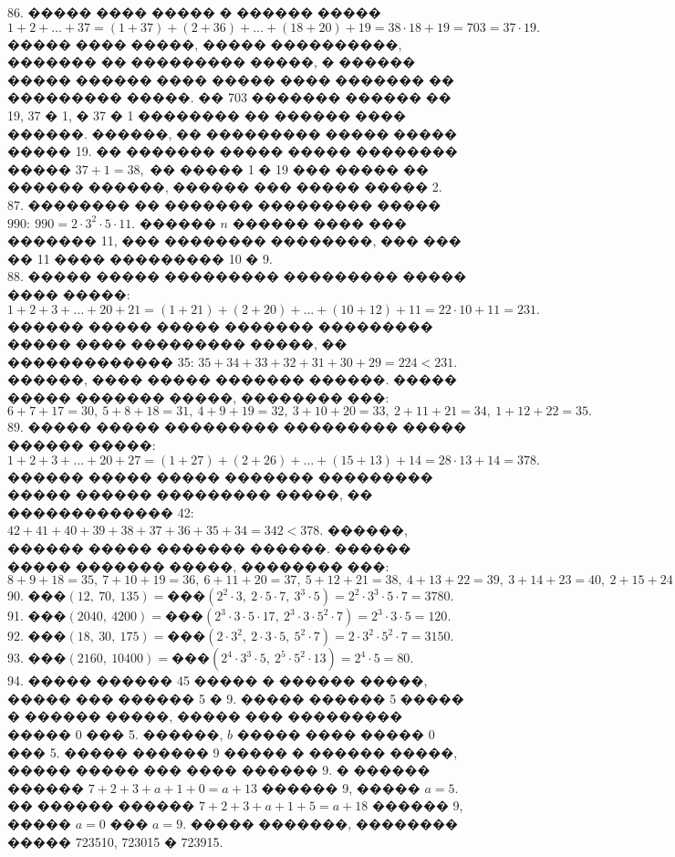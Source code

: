 \documentclass[12pt]{article}
\begin{document}
86. ����� ���� ����� � ������ ����� $1+2+\ldots+37=(1+37)+(2+36)+\ldots+(18+20)+19=38\cdot18+19=703=37\cdot19.$ ����� ���� �����, ����� ����������, ������� �� ��������� �����, � ������ ����� ������ ���� ����� ���� ������� �� ��������� �����. �� 703 ������� ������ �� 19, 37 � 1, � 37 � 1 �������� �� ������ ���� ������. ������, �� ��������� ����� ����� ����� 19. �� ������� ����� ����� �������� ����� $37+1=38,$ �� ����� 1 � 19 ��� ����� �� ������ ������, ������ ��� ����� ����� 2.\\
87. �������� �� ������� ��������� ����� $990:\ 990=2\cdot3^2\cdot5\cdot11.$ ������ $n$ ������ ���� ��� ������� 11, ��� �������� ��������, ��� ��� �� 11 ���� ��������� 10 � 9.\\
88. ����� ����� ��������� ��������� ����� ���� �����: $1+2+3+\ldots+20+21=(1+21)+(2+20)+\ldots+(10+12)+11=22\cdot10+11=231.$ ������ ����� ����� ������� ��������� ����� ���� ��������� �����, �� ������������� 35: $35+34+33+32+31+30+29=224<231.$ ������, ���� ����� ������� ������. ����� ����� ������� �����, �������� ���:
$6+7+17=30,\ 5+8+18=31,\ 4+9+19=32,\ 3+10+20=33,\ 2+11+21=34,\ 1+12+22=35.$\\
89. ����� ����� ��������� ��������� ����� ������ �����: $1+2+3+\ldots+20+27=(1+27)+(2+26)+\ldots+(15+13)+14=28\cdot13+14=378.$ ������ ����� ����� ������� ��������� ����� ������ ��������� �����, �� ������������� 42: $42+41+40+39+38+37+36+35+34=342<378.$ ������, ������ ����� ������� ������. ������ ����� ������� �����, �������� ���:
$8+9+18=35,\ 7+10+19=36,\ 6+11+20=37,\ 5+12+21=38,\ 4+13+22=39,\ 3+14+23=40,\ 2+15+24=41,\ 1+16+25=42.$\\
90. ���$(12,\ 70,\ 135) =$���$(2^2\cdot3,\ 2\cdot5\cdot7,\ 3^3\cdot5)=2^2\cdot3^3\cdot5\cdot7=3780.$\\
91. ���$(2040,\ 4200)=$���$(2^3\cdot3\cdot5\cdot17,\ 2^3\cdot3\cdot5^2\cdot7)=2^3\cdot3\cdot5=120.$\\
92. ���$(18,\ 30,\ 175)=$���$(2\cdot3^2,\ 2\cdot3\cdot5,\ 5^2\cdot7)=2\cdot3^2\cdot5^2\cdot7=3150.$\\
93. ���$(2160,\ 10400)=$���$(2^4\cdot3^3\cdot5,\ 2^5\cdot5^2\cdot13)=2^4\cdot5=80.$\\
94. ����� ������ 45 ����� � ������ �����, ����� ��� ������ 5 � 9. ����� ������ 5 ����� � ������ �����, ����� ��� ��������� ����� 0 ��� 5. ������, $b$ ����� ���� ����� 0 ��� 5. ����� ������ 9 ����� � ������ �����, ����� ����� ��� ���� ������ 9. � ������ ������ $7+2+3+a+1+0=a+13$ ������ 9, ����� $a=5.$ �� ������ ������
$7+2+3+a+1+5=a+18$ ������ 9, ����� $a=0$ ��� $a=9.$ ����� �������, �������� ����� 723510, 723015 � 723915.\\
\end{document}
